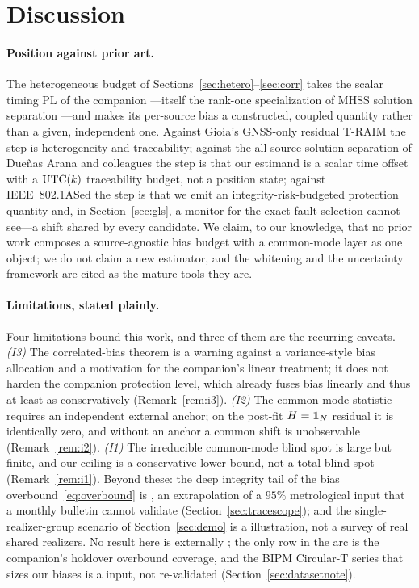 \section{Discussion}
\label{sec:discussion}

\paragraph{Position against prior art.}
The heterogeneous budget of Sections~\ref{sec:hetero}--\ref{sec:corr} takes the
scalar timing PL of the companion \citep{baweja2026cti}---itself the rank-one
specialization of MHSS solution separation \citep{blanch2015,joerger2014}---and
makes its per-source bias a constructed, coupled quantity rather than a given,
independent one. Against Gioia's GNSS-only residual T-RAIM \citep{gioia2023} the
step is heterogeneity and traceability; against the all-source solution separation
of Due{\~n}as Arana and colleagues \citep{duenasarana2020} the step is that our
estimand is a scalar time offset with a $\mathrm{UTC}(k){}$ traceability budget, not a
position state; against IEEE~802.1ASed \citep{ieee8021ased} the step is that we emit
an integrity-risk-budgeted protection quantity and, in Section~\ref{sec:gls}, a
monitor for the exact fault selection cannot see---a shift shared by every
candidate. We claim, to our knowledge, that no prior work composes a
source-agnostic bias budget with a common-mode layer as one object; we do not claim
a new estimator, and the whitening \citep{aitken1935} and the uncertainty framework
\citep{jcgm100} are cited as the mature tools they are.

\paragraph{Limitations, stated plainly.}
Four limitations bound this work, and three of them are the recurring caveats.
\emph{(I3)} The correlated-bias theorem is a warning against a variance-style bias
allocation and a motivation for the companion's linear treatment; it does not
harden the companion protection level, which already fuses bias linearly and thus
at least as conservatively (Remark~\ref{rem:i3}). \emph{(I2)} The common-mode
statistic requires an independent external anchor; on the post-fit $H=\bm 1_N$
residual it is identically zero, and without an anchor a common shift is
unobservable (Remark~\ref{rem:i2}). \emph{(I1)} The irreducible common-mode blind
spot is large but finite, and our ceiling is a conservative lower bound, not a
total blind spot (Remark~\ref{rem:i1}). Beyond these: the deep integrity tail
of the bias overbound~\eqref{eq:overbound} is \Modelled{}, an extrapolation of a
$95\%$ metrological input that a monthly bulletin cannot validate
(Section~\ref{sec:tracescope}); and the single-realizer-group scenario of
Section~\ref{sec:demo} is a \Modelled{} illustration, not a survey of real shared
realizers. No result here is externally \Validated{}; the only \Validated{} row in
the arc is the companion's holdover overbound coverage, and the BIPM Circular-T
series that sizes our biases is a \Cited{} input, not re-validated
(Section~\ref{sec:datasetnote}).

